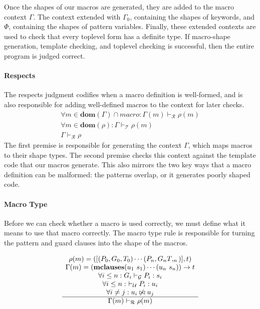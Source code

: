 \documentclass[11pt]{article}
\begin{document}
Once the shapes of our macros are generated, they are added to the macro context $\Gamma$. The context extended with $\Gamma_0$, containing the shapes of keywords, and $\Phi$, containing the shapes of pattern variables. Finally, these extended contexts are used to check that every toplevel form has a definite type. If macro-shape generation, template checking, and toplevel checking is successful, then the entire program is judged correct.  

\paragraph{Respects}
The respects judgment codifies when a macro definition is well-formed, and is also responsible for adding well-defined macros to the context for later checks. 
\[\begin{array}{c}
\forall m \in \textbf{dom}(\Gamma) \cap macro : \Gamma(m) \vdash_\mathcal R\rho (m) \\
\forall m \in \textbf{dom} (\rho) : \Gamma \vdash_\mathcal T \rho(m)
\\\hline
\Gamma \vdash_\mathcal R \rho
\end{array}\]
The first premise is responsible for generating the context $\Gamma$, which maps macros to their shape types. The second premise checks this context against the template code that our macros generate. This also mirrors the two key ways that a macro definition can be malformed: the patterns overlap, or it generates poorly shaped code. 
\paragraph{Macro Type}

Before we can check whether a macro is used correctly, we must define what it means to use that macro correctly. The macro type rule is responsible for turning the pattern and guard clauses into the shape of the macros.

\[\begin{array}{c}
\rho(m) = ([(P_0, G_0, T_0) \cdots (P_n,G_nT,_n)],t) \\
\Gamma(m) = (\textbf{mclauses} (u_1\ s_1) \cdots (u_n\ s_n)) \rightarrow t \\
\forall i \le n : G_i \vdash_\mathcal G P_i : s_i \\
\forall i \le n :\  \vdash_\mathcal U  P_i : u_i \\
\forall i \ne j : u_i \not\bowtie u_j
\\\hline
\Gamma(m) \vdash_\mathcal R \rho(m)
\end{array}\\[0.5cm]\]
\end{document}
